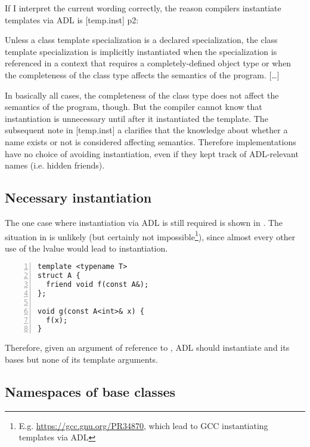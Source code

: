 If I interpret the current wording correctly, the reason compilers instantiate templates 
via ADL is [temp.inst] p2:
\begin{wgText}

\setcounter{Paras}{1}
\pnum Unless a class template specialization is a declared specialization, the class 
template specialization is implicitly instantiated when the specialization is referenced 
in a context that requires a completely-defined object type or when the completeness of 
the class type affects the semantics of the program. [\ldots]

\end{wgText}
In basically all cases, the completeness of the class type does not affect the semantics 
of the program, though. But the compiler cannot know that instantiation is unnecessary 
until after it instantiated the template. The subsequent note in [temp.inst] a
clarifies that the knowledge about whether a name exists or not is considered affecting 
semantics. Therefore implementations have no choice of avoiding instantiation, even if 
they kept track of ADL-relevant names (i.e. hidden friends).


\subsection{Necessary instantiation}

The one case where instantiation via ADL is still required is shown in 
. The situation in  is unlikely (but 
certainly not impossible\footnote{E.g. \url{https://gcc.gnu.org/PR34870}, which lead to 
GCC instantiating templates via ADL}), since almost every other use of the lvalue  
would lead to instantiation.
\begin{lstlisting}[style=Vc,numbers=left,float={hbtp},label=lst:needsInstantiation,caption={
Requires instantiation or reasonable code could break.
}]
template <typename T>
struct A {
  friend void f(const A&);
};

void g(const A<int>& x) {
  f(x);
}
\end{lstlisting}

Therefore, given an argument of reference to , ADL should instantiate  and 
its bases but none of its template arguments.

\subsection{Namespaces of base classes}

